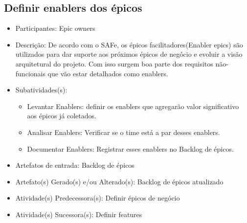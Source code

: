 \subsection{Definir enablers dos épicos}
\begin{itemize}
\item Participantes: Epic owners

\item Descrição: De acordo com o SAFe, os épicos facilitadores(Enabler epics) são utilizados para dar suporte aos próximos épicos de negócio e evoluir a visão arquitetural do projeto. Com isso surgem boa parte dos requisitos não-funcionais que vão estar detalhados como enablers.

\item Subatividades(s):
	\begin{itemize} 
    \item Levantar Enablers: definir os enablers que agregarão valor significativo aos épicos já coletados.
    \item Analisar Enablers: Verificar se o time está a par desses enablers.
    \item Documentar Enablers:  Registrar esses enablers no Backlog de épicos.
    \end{itemize}
\item Artefatos de entrada: Backlog de épicos

\item Artefato(s) Gerado(s) e/ou Alterado(s): Backlog de épicos atualizado

\item Atividade(s) Predecessora(s): Definir épicos de negócio
  
\item Atividade(s) Sucessora(s): Definir features
\end{itemize}
